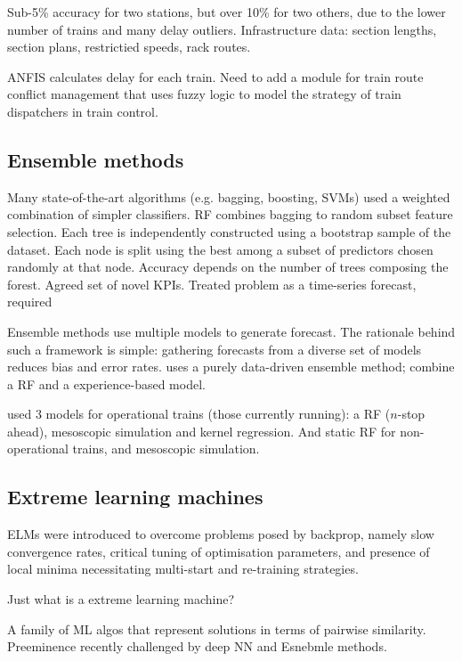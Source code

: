 \documentclass{article}
\begin{document}
Sub-5\% accuracy for two stations, but over 10\% for two others, due to the lower number of trains and many delay outliers. 
Infrastructure data: section lengths, section plans, restrictied speeds, rack routes. 

ANFIS calculates delay for each train. Need to add a module for train route conflict management that uses fuzzy logic to model the strategy of train dispatchers in train control.


\subsection{Ensemble methods}

Many state-of-the-art algorithms (e.g. bagging, boosting, SVMs) used a weighted combination of simpler classifiers. RF combines bagging to random subset feature selection. Each tree is independently constructed using a bootstrap sample of the dataset. Each node is split using the best among a subset of predictors chosen randomly at that node. Accuracy depends on the number of trees composing the forest. Agreed set of novel KPIs. Treated problem as a time-series forecast, required 

Ensemble methods use multiple models to generate forecast. The rationale behind such a framework is simple: gathering forecasts from a diverse set of models reduces bias and error rates. \cite{nair_et_al_2019} uses a purely data-driven ensemble method; \cite{oneto_et_al_2018} combine a RF and a experience-based model.

\cite{nair_et_al_2019} used 3 models for operational trains (those currently running): a RF ($n$-stop ahead), mesoscopic simulation and kernel regression.
And static RF for non-operational trains, and mesoscopic simulation.

\subsection{Extreme learning machines}

ELMs were introduced to overcome problems posed by backprop, namely slow convergence rates, critical tuning of optimisation parameters, and presence of local minima necessitating multi-start and re-training strategies. 

Just what is a extreme learning machine?


A family of ML algos that represent solutions in terms of pairwise similarity. Preeminence recently challenged by deep NN and Esnebmle methods. 
\end{document}
